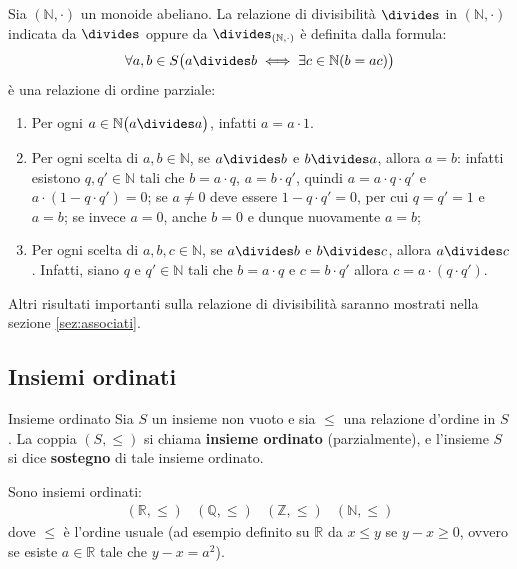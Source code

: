 \begin{example}\label{exmp:divisibilità}
	Sia $(\mathbb{N}, \cdot)$ un monoide abeliano. La relazione di divisibilità $\divides$ in $(\mathbb{N},\cdot)$ indicata da $\divides$ oppure da $\divides_{(\mathbb{N},\cdot)}$ è definita dalla formula:
	\begin{equation}
		\forall a,b \in S \bigl( a \divides b \iff \exists c \in \mathbb{N} (b = ac)\bigr)
	\end{equation}
	è una relazione di ordine parziale:
	\begin{enumerate}
		\item Per ogni $a \in \mathbb{N} \bigl( a \divides a \bigr)$, infatti $a = a \cdot 1$.
		\item Per ogni scelta di $a,b \in \mathbb{N}$, se $a \divides b$ e $b \divides a$, allora $a = b$: infatti esistono $q,q' \in \mathbb{N}$ tali che $b=a \cdot q$, $a=b \cdot q'$, quindi $a= a \cdot q \cdot q'$ e $a \cdot (1-q \cdot q') = 0$; se $a \neq 0$ deve essere $1-q \cdot q' = 0$, per cui $q = q' = 1$ e $a=b$; se invece $a=0$, anche $b=0$ e dunque nuovamente $a=b$;
		\item Per ogni scelta di $a,b,c \in \mathbb{N}$, se $a \divides b$ e $b \divides c$, allora $a \divides c$. Infatti, siano $q$ e $q' \in \mathbb{N}$ tali che $b= a \cdot q$ e $c = b \cdot q'$ allora $c = a \cdot (q \cdot q')$.
	\end{enumerate}
Altri risultati importanti sulla relazione di divisibilità saranno mostrati nella sezione \ref{sez:associati}.
\end{example}

\subsection{Insiemi ordinati}\label{sez:ordine}
\begin{defbox}{Insieme ordinato}
	Sia $S$ un insieme non vuoto e sia $\leq$ una relazione d'ordine in $S$. La coppia $(S, \leq)$ si chiama \textbf{insieme ordinato} (parzialmente), e l'insieme $S$ si dice \textbf{sostegno} di tale insieme ordinato.
	
\end{defbox}

\begin{example}
Sono insiemi ordinati:
		\begin{displaymath}
			\begin{array}{llll}
				(\mathbb{R},\leq) & (\mathbb{Q},\leq) & (\mathbb{Z}, \leq) & (\mathbb{N}, \leq)
			\end{array}
		\end{displaymath}
		dove $\leq$ è l'ordine usuale (ad esempio definito su $\mathbb{R}$ da $x \leq y$ se $y-x\geq0$, ovvero se esiste $a \in \mathbb{R}$ tale che $y-x=a^{2}$).
\end{example}

